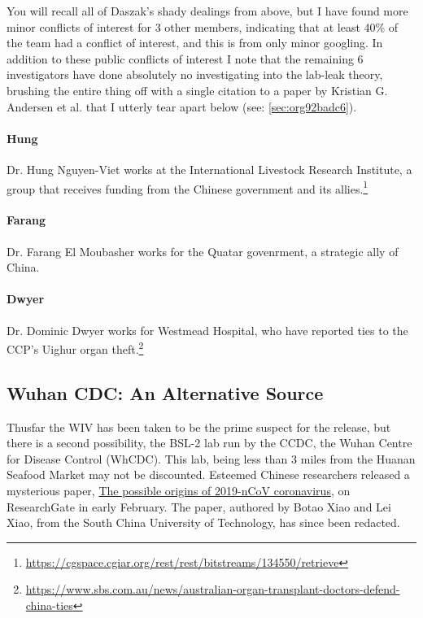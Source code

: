 \documentclass[11pt]{article}
\begin{document}
You will recall all of Daszak's shady dealings from above, but I have found more minor conflicts of interest for 3 other members, indicating that at least 40\% of the team had a conflict of interest, and this is from only minor googling. In addition to these public conflicts of interest I note that the remaining 6 investigators have done absolutely no investigating into the lab-leak theory, brushing the entire thing off with a single citation to a paper by Kristian G. Andersen et al. that I utterly tear apart below (see: \ref{sec:org92badc6}).

\paragraph{Hung}
\label{sec:org2047971}
Dr. Hung Nguyen-Viet works at the International Livestock Research Institute, a group that receives funding from the Chinese government and its allies.\footnote{\url{https://cgspace.cgiar.org/rest/rest/bitstreams/134550/retrieve}}
\paragraph{Farang}
\label{sec:org80a75b5}
Dr. Farang El Moubasher works for the Quatar govenrment, a strategic ally of China.
\paragraph{Dwyer}
\label{sec:org57c9135}
Dr. Dominic Dwyer works for Westmead Hospital, who have reported ties to the CCP's Uighur organ theft.\footnote{\url{https://www.sbs.com.au/news/australian-organ-transplant-doctors-defend-china-ties}}
\subsection{Wuhan CDC: An Alternative Source}
\label{sec:org9d2d0fa}
Thusfar the WIV has been taken to be the prime suspect for the release, but there is a second possibility, the BSL-2 lab run by the CCDC, the Wuhan Centre for Disease Control (WhCDC). This lab, being less than 3 miles from the Huanan Seafood Market may not be discounted. Esteemed Chinese researchers released a mysterious paper, \href{https://web.archive.org/web/20200214144447/https://www.researchgate.net/publication/339070128\_The\_possible\_origins\_of\_2019-nCoV\_coronavirus}{The possible origins of 2019-nCoV coronavirus}, on ResearchGate in early February. The paper, authored by Botao Xiao and Lei Xiao, from the South China University of Technology, has since been redacted.
\end{document}
